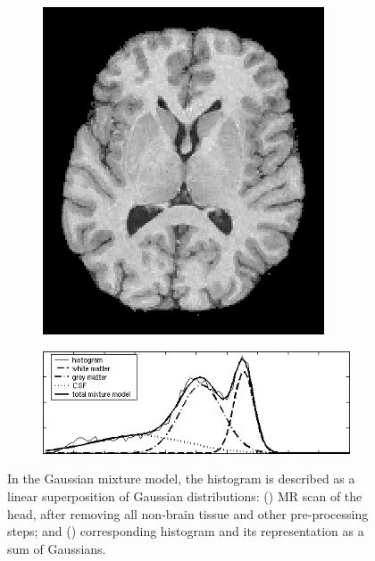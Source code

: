 \documentclass[10pt,twoside]{book}
\begin{document}
\begin{figure}
  \centering
  \begin{subfigure}{0.32\textwidth}
    \includegraphics[width=\textwidth]{brain}
    \caption{}
    \label{fig:GMM_brain}
  \end{subfigure}
  \begin{subfigure}{0.94\textwidth}
    \includegraphics[width=\textwidth]{brainHistogram}
    \caption{}
    \label{fig:GMM_histogram}
  \end{subfigure}  
  \caption{In the Gaussian mixture model, the histogram is described as a linear superposition of Gaussian distributions: () MR scan of the head, after removing all non-brain tissue and other pre-processing steps; and () corresponding histogram and its representation as a sum of Gaussians.}
  \label{fig:GMM}
\end{figure}
\end{document}
